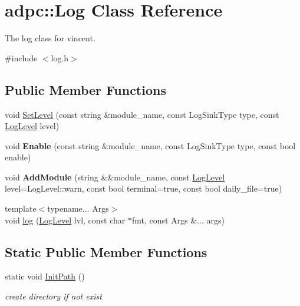 \hypertarget{classadpc_1_1Log}{}\section{adpc\+:\+:Log Class Reference}
\label{classadpc_1_1Log}


The log class for vincent.  




{\ttfamily \#include $<$log.\+h$>$}

\subsection*{Public Member Functions}
\begin{DoxyCompactItemize}
\item 
void \hyperlink{classadpc_1_1Log_a2e8bf1e2c8ac8381be9022df60530f87}{Set\+Level} (const string \&module\+\_\+name, const Log\+Sink\+Type type, const \hyperlink{log__config_8h_a172986fa5f658c5fe0b42bd954e9e133}{Log\+Level} level)
\item 
\mbox{\label{classadpc_1_1Log_ae9c832f1a8d5f684308f5ef95d53cf36}} 
void {\bfseries Enable} (const string \&module\+\_\+name, const Log\+Sink\+Type type, const bool enable)
\item 
\mbox{\label{classadpc_1_1Log_a599ccdccf8a85ae3779a8f587424cea8}} 
void {\bfseries Add\+Module} (string \&\&module\+\_\+name, const \hyperlink{log__config_8h_a172986fa5f658c5fe0b42bd954e9e133}{Log\+Level} level=Log\+Level\+::warn, const bool terminal=true, const bool daily\+\_\+file=true)
\end{DoxyCompactItemize}
\textbf{ }\par
\begin{DoxyCompactItemize}
\item 
{\footnotesize template$<$typename... Args$>$ }\\void \hyperlink{classadpc_1_1Log_ae3e21b4038776f15d0b5ebdfebc41f57}{log} (\hyperlink{log__config_8h_a172986fa5f658c5fe0b42bd954e9e133}{Log\+Level} lvl, const char $\ast$fmt, const Args \&... args)
\end{DoxyCompactItemize}

\subsection*{Static Public Member Functions}
\begin{DoxyCompactItemize}
\item 
static void \hyperlink{classadpc_1_1Log_a41b80ba97a00d128777d22f369bc791f}{Init\+Path} ()
\begin{DoxyCompactList}\small\item\em create directory if not exist \end{DoxyCompactList}\end{DoxyCompactItemize}
